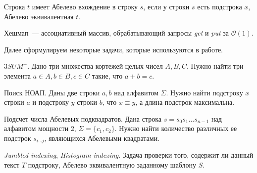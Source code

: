 \begin{definition}
Строка $t$ имеет Абелево вхождение в строку $s$, если у строки $s$ есть подстрока $x$, Абелево эквивалентная $t$.
\end{definition}


\begin{definition}
Хешмап~--- ассоциативный массив, обрабатывающий запросы \textit{get} и \textit{put} за $\mathcal{O}(1)$.
\end{definition}

Далее сформулируем некоторые задачи, которые используются в работе.

\begin{problem}
$3SUM^+$. Дано три множества кортежей целых чисел $A, B, C$. Нужно найти три элемента $a \in A, b \in B, c \in C$ такие, что $a+b=c$.
\end{problem}

\begin{problem}
Поиск НОАП. Даны две строки $a, b$ над алфавитом $\Sigma$. Нужно найти подстроку $x$ строки $a$ и подстроку $y$ строки $b$, что $x \equiv y$, а длина подстрок максимальна.
\end{problem}

\begin{problem}
Подсчет числа Абелевых подквадратов. Дана строка $s=s_0s_1 \ldots s_{n-1}$ над алфавитом мощности 2, $\Sigma = \{c_1, c_2\}$. Нужно найти количество различных ее подстрок $s_{i \cdots j}$, являющихся Абелевыми квадратами.
\end{problem}

\begin{problem}
\textit{Jumbled indexing}, \textit{Histogram indexing}. Задача проверки того, содержит ли данный текст $T$ подстроку, Абелево эквивалентную заданному шаблону $S$.
\end{problem}





